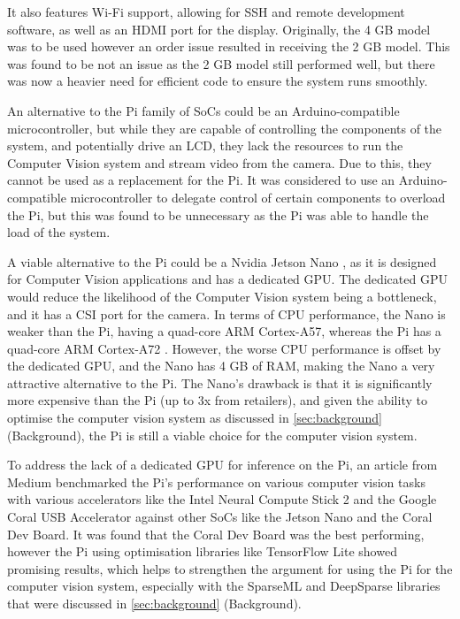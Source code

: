 It also features Wi-Fi support, allowing for SSH and remote development software, as well as an HDMI port for the display. Originally, the 4 GB model was to be used however an order issue resulted in receiving the 2 GB model. This was found to be not an issue as the 2 GB model still performed well, but there was now a heavier need for efficient code to ensure the system runs smoothly.

An alternative to the Pi family of SoCs could be an Arduino-compatible microcontroller, but while they are capable of controlling the components of the system, and potentially drive an LCD, they lack the resources to run the Computer Vision system and stream video from the camera. Due to this, they cannot be used as a replacement for the Pi. It was considered to use an Arduino-compatible microcontroller to delegate control of certain components to overload the Pi, but this was found to be unnecessary as the Pi was able to handle the load of the system.

A viable alternative to the Pi could be a Nvidia Jetson Nano \cite{jetsonnano}, as it is designed for Computer Vision applications and has a dedicated GPU. The dedicated GPU would reduce the likelihood of the Computer Vision system being a bottleneck, and it has a CSI port for the camera. In terms of CPU performance, the Nano is weaker than the Pi, having a quad-core ARM Cortex-A57, whereas the Pi has a quad-core ARM Cortex-A72 \cite{pi4}. However, the worse CPU performance is offset by the dedicated GPU, and the Nano has 4 GB of RAM, making the Nano a very attractive alternative to the Pi. The Nano's drawback is that it is significantly more expensive than the Pi (up to 3x from retailers), and
given the ability to optimise the computer vision system as discussed in \autoref{sec:background} (Background), the Pi is still a viable choice for the computer vision system.

To address the lack of a dedicated GPU for inference on the Pi, an article from Medium \cite{benchmarks} benchmarked the Pi's performance on various computer vision tasks with various accelerators like the Intel Neural Compute Stick 2 and the Google Coral USB Accelerator against other SoCs like the Jetson Nano and the Coral Dev Board. It was found that the Coral Dev Board was the best performing, however the Pi using optimisation libraries like TensorFlow Lite showed promising results, which helps to strengthen the argument for using the Pi for the computer vision system, especially with the SparseML and DeepSparse libraries that were discussed in \autoref{sec:background} (Background).

